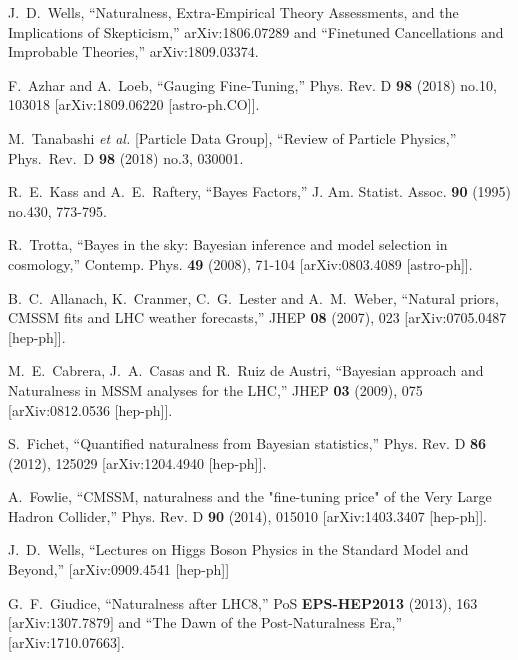 \documentclass[12pt]{article}
\numberwithin{equation}{section}
\begin{document}
\begin{thebibliography}{999}
  J.~D.~Wells,
  ``Naturalness, Extra-Empirical Theory Assessments, and the Implications of
  Skepticism,'' arXiv:1806.07289 and 
  ``Finetuned Cancellations and Improbable Theories,'' arXiv:1809.03374.

F.~Azhar and A.~Loeb,
``Gauging Fine-Tuning,''
Phys. Rev. D \textbf{98} (2018) no.10, 103018
[arXiv:1809.06220 [astro-ph.CO]].

  M.~Tanabashi {\it et al.} [Particle Data Group],
  ``Review of Particle Physics,''
  Phys.\ Rev.\ D {\bf 98} (2018) no.3,  030001.
  
R.~E.~Kass and A.~E.~Raftery,
``Bayes Factors,''
J. Am. Statist. Assoc. \textbf{90} (1995) no.430, 773-795.  

R.~Trotta,
``Bayes in the sky: Bayesian inference and model selection in cosmology,''
Contemp. Phys. \textbf{49} (2008), 71-104
[arXiv:0803.4089 [astro-ph]].  

B.~C.~Allanach, K.~Cranmer, C.~G.~Lester and A.~M.~Weber,
``Natural priors, CMSSM fits and LHC weather forecasts,''
JHEP \textbf{08} (2007), 023
[arXiv:0705.0487 [hep-ph]].

M.~E.~Cabrera, J.~A.~Casas and R.~Ruiz de Austri,
``Bayesian approach and Naturalness in MSSM analyses for the LHC,''
JHEP \textbf{03} (2009), 075
[arXiv:0812.0536 [hep-ph]].

S.~Fichet,
``Quantified naturalness from Bayesian statistics,''
Phys. Rev. D \textbf{86} (2012), 125029
[arXiv:1204.4940 [hep-ph]].

A.~Fowlie,
``CMSSM, naturalness and the "fine-tuning price" of the Very Large Hadron Collider,''
Phys. Rev. D \textbf{90} (2014), 015010
[arXiv:1403.3407 [hep-ph]].

J.~D.~Wells, ``Lectures on Higgs Boson Physics in the Standard Model and Beyond,''
[arXiv:0909.4541 [hep-ph]]

G.~F.~Giudice,
``Naturalness after LHC8,''
PoS \textbf{EPS-HEP2013} (2013), 163\\
$\mbox{[arXiv:1307.7879]}$ and
``The Dawn of the Post-Naturalness Era,''
[arXiv:1710.07663].


\end{thebibliography}
\end{document}
